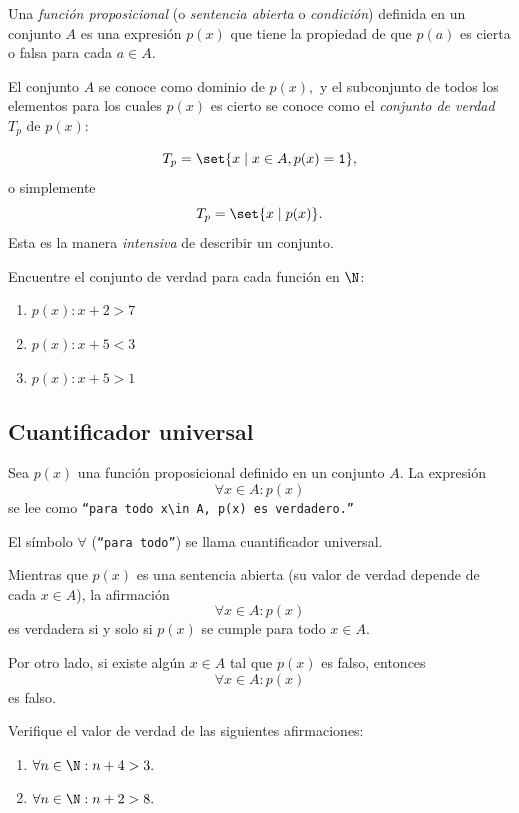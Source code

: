 Una \emph{función proposicional} (o \emph{sentencia abierta} o \emph{condición}) definida en un conjunto $A$ es una expresión $p(x)$ que tiene la propiedad de que $p(a)$ es cierta o falsa para cada $a \in A.$



 El conjunto $A$ se conoce como dominio de $p(x),$ y el subconjunto de todos los elementos para los cuales $p(x)$ es cierto se conoce como el \emph{conjunto de verdad} $T_{p}$ de $p(x):$
 
 $$T_{p}=\set{x \mid x\in A, p(x)=\texttt{1}},$$ 
 o simplemente 
 $$
 T_{p}=\set{x \mid p(x)}.
 $$
Esta es la manera \emph{intensiva} de describir un conjunto.



 \begin{ejemplo}
  \label{lip:exmp:4.7}
  Encuentre el conjunto de verdad para cada función en $\N$:
  \begin{enumerate}
   \item $p(x): x+2>7$ 
   \item $p(x): x+5<3$ 
   \item $p(x): x+5>1$ 
  \end{enumerate}

 \end{ejemplo}



\subsection{Cuantificador universal}


 Sea $p(x)$ una función proposicional definido en un conjunto $A.$ La expresión
 \[
 \label{lip:4.1}
   \forall x \in A: p(x)
 \] 
 se lee como  \texttt{``para todo $x\in A,$ $p(x)$ es verdadero.''}  
 
 El símbolo $\forall$ (\texttt{``para todo''}) se llama cuantificador universal.




 Mientras que $p(x)$ es una sentencia abierta (su valor de verdad depende de cada $x\in A$), la afirmación 
 $$\forall x\in A: p(x)$$ es verdadera si y solo si $p(x)$ se cumple para todo $x\in A.$  



 Por otro lado, si existe algún $x\in A$ tal que $p(x)$ es falso, entonces $$\forall x\in A: p(x)$$ es falso.



 \begin{ejemplo}
  \label{lip:exmp:4.8}
  Verifique el valor de verdad de las siguientes afirmaciones:
  \begin{enumerate}
   \item $\forall n \in \N: n+4>3.$ 
   \item $\forall n \in \N: n+2>8.$
  \end{enumerate}

 \end{ejemplo}



